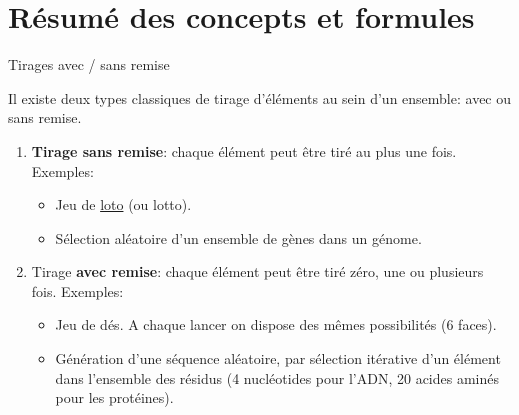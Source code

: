 \documentclass[ignorenonframetext,]{beamer}
\providecommand{\tightlist}{%
  \setlength{\itemsep}{0pt}\setlength{\parskip}{0pt}}
\begin{document}
\section{Résumé des concepts et
formules}\label{resume-des-concepts-et-formules}

\begin{frame}{Tirages avec / sans remise}

Il existe deux types classiques de tirage d'éléments au sein d'un
ensemble: avec ou sans remise.

\begin{enumerate}
\def\labelenumi{\arabic{enumi}.}
\item
  \textbf{Tirage sans remise}: chaque élément peut être tiré au plus une
  fois. Exemples:

  \begin{itemize}
  \tightlist
  \item
    Jeu de \href{https://fr.wikipedia.org/wiki/Loto}{loto} (ou lotto).
  \item
    Sélection aléatoire d'un ensemble de gènes dans un génome.
  \end{itemize}
\item
  Tirage \textbf{avec remise}: chaque élément peut être tiré zéro, une
  ou plusieurs fois. Exemples:

  \begin{itemize}
  \tightlist
  \item
    Jeu de dés. A chaque lancer on dispose des mêmes possibilités (6
    faces).
  \item
    Génération d'une séquence aléatoire, par sélection itérative d'un
    élément dans l'ensemble des résidus (4 nucléotides pour l'ADN, 20
    acides aminés pour les protéines).
  \end{itemize}
\end{enumerate}

\end{frame}
\end{document}
